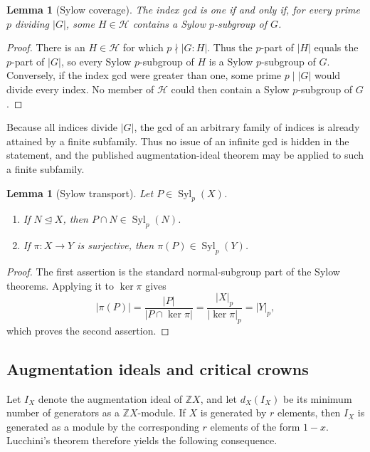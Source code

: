\documentclass[11pt,reqno]{amsart}
\newtheorem{lemma}[theorem]{Lemma}
\theoremstyle{remark}
\DeclareMathOperator{\Syl}{Syl}
\begin{document}
\begin{lemma}[Sylow coverage]\label{lem:sylow-coverage}
The index gcd is one if and only if, for every prime $p$ dividing
$\lvert G\rvert$, some $H\in\mathcal H$ contains a Sylow $p$-subgroup of
$G$.
\end{lemma}

\begin{proof}
There is an $H\in\mathcal H$ for which
$p\nmid\lvert G:H\rvert$.  Thus the $p$-part of $\lvert H\rvert$ equals the
$p$-part of $\lvert G\rvert$, so every Sylow $p$-subgroup of $H$ is a Sylow
$p$-subgroup of $G$.  Conversely, if the index gcd were greater than one,
some prime $p\mid\lvert G\rvert$ would divide every index.  No member of
$\mathcal H$ could then contain a Sylow $p$-subgroup of $G$.
\end{proof}

Because all indices divide $\lvert G\rvert$, the gcd of an arbitrary family
of indices is already attained by a finite subfamily.  Thus no issue of an
infinite gcd is hidden in the statement, and the published augmentation-ideal
theorem may be applied to such a finite subfamily.

\begin{lemma}[Sylow transport]\label{lem:sylow-transport}
Let $P\in\Syl_p(X)$.
\begin{enumerate}
\item If $N\unlhd X$, then $P\cap N\in\Syl_p(N)$.
\item If $\pi:X\to Y$ is surjective, then $\pi(P)\in\Syl_p(Y)$.
\end{enumerate}
\end{lemma}

\begin{proof}
The first assertion is the standard normal-subgroup part of the Sylow
theorems.  Applying it to $\ker\pi$ gives
\[
 |\pi(P)|=\frac{|P|}{|P\cap\ker\pi|}
          =\frac{|X|_p}{|\ker\pi|_p}=|Y|_p,
\]
which proves the second assertion.
\end{proof}

\subsection{Augmentation ideals and critical crowns}

Let $I_X$ denote the augmentation ideal of $\mathbb Z X$, and let
$d_X(I_X)$ be its minimum number of generators as a $\mathbb Z X$-module.
If $X$ is generated by $r$ elements, then $I_X$ is generated as a module by
the corresponding $r$ elements of the form $1-x$.  Lucchini's theorem
therefore yields the following consequence.
\end{document}
